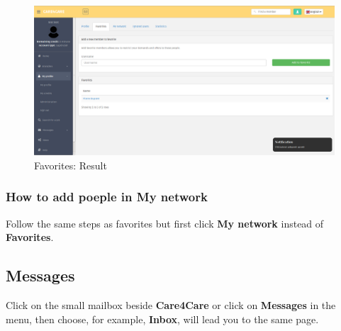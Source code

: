 \documentclass{article}
\begin{document}
\begin{figure}[!ht]
   \includegraphics[width=\textwidth]{img/fav4.png}
   \caption{Favorites: Result}
\end{figure}
\subsubsection{How to add poeple in My network}
Follow the same steps as favorites but first click \textbf{My network} instead of \textbf{Favorites}.

\clearpage
\subsection{Messages}
Click on the small mailbox beside \textbf{Care4Care} or click on \textbf{Messages} in the menu, then choose, for example, \textbf{Inbox}, will lead you to the same page. 
\end{document}
